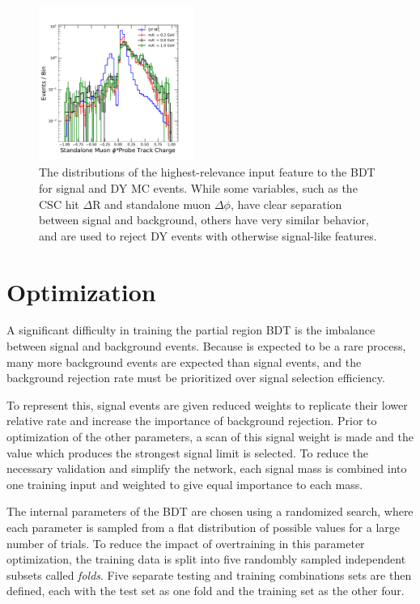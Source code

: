 \begin{figure}[htpb]
	\includegraphics[width=0.45\textwidth]{figures/bdtInputFeatsstaPhi.pdf}
	\caption[Input BDT Classification Features]{The distributions of the highest-relevance input feature to the BDT for signal and DY MC events. While some variables, such as the CSC hit $\Delta$R and standalone muon $\Delta\phi$, have clear separation between signal and background, others have very similar behavior, and are used to reject DY events with otherwise signal-like features.}
\end{figure}

\section{Optimization}
A significant difficulty in training the partial region BDT is the imbalance between signal and background events. 
Because \dbrem is expected to be a rare process, many more background events are expected than signal events, and the background rejection rate must be prioritized over signal selection efficiency.

To represent this, signal events are given reduced weights to replicate their lower relative rate and increase the importance of background rejection.
Prior to optimization of the other parameters, a scan of this signal weight is made and the value which produces the strongest signal limit is selected.
To reduce the necessary validation and simplify the network, each signal mass is combined into one training input and weighted to give equal importance to each mass.

The internal parameters of the BDT are chosen using a randomized search, where each parameter is sampled from a flat distribution of possible values for a large number of trials.
To reduce the impact of overtraining in this parameter optimization, the training data is split into five randombly sampled independent subsets called \emph{folds}.
Five separate testing and training combinations sets are then defined, each with the test set as one fold and the training set as the other four.

